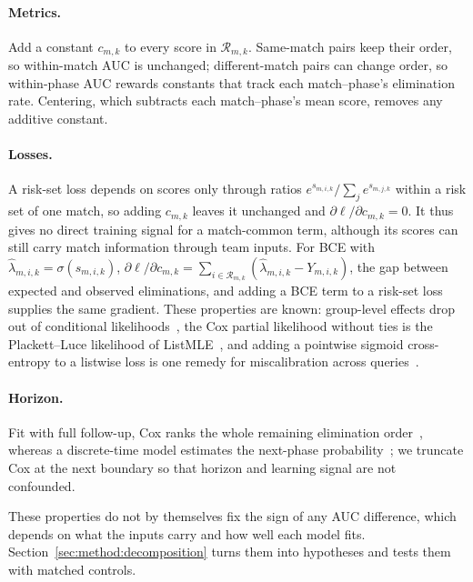 \documentclass[sigconf,anonymous]{acmart}
\begin{document}
\paragraph{Metrics.}
Add a constant $c_{m,k}$ to every score in $\mathcal{R}_{m,k}$. Same-match pairs keep their order, so within-match AUC is unchanged; different-match pairs can change order, so within-phase AUC rewards constants that track each match--phase's elimination rate. Centering, which subtracts each match--phase's mean score, removes any additive constant.

\paragraph{Losses.}
A risk-set loss depends on scores only through ratios $e^{s_{m,i,k}}/\sum_{j}e^{s_{m,j,k}}$ within a risk set of one match, so adding $c_{m,k}$ leaves it unchanged and $\partial\ell/\partial c_{m,k}=0$. It thus gives no direct training signal for a match-common term, although its scores can still carry match information through team inputs. For BCE with $\hat\lambda_{m,i,k}=\sigma(s_{m,i,k})$, $\partial\ell/\partial c_{m,k}=\sum_{i\in\mathcal{R}_{m,k}}(\hat\lambda_{m,i,k}-Y_{m,i,k})$, the gap between expected and observed eliminations, and adding a BCE term to a risk-set loss supplies the same gradient. These properties are known: group-level effects drop out of conditional likelihoods~\cite{Chamberlain80}, the Cox partial likelihood without ties is the Plackett--Luce likelihood of ListMLE~\cite{Xia08}, and adding a pointwise sigmoid cross-entropy to a listwise loss is one remedy for miscalibration across queries~\cite{Bai23}.

\paragraph{Horizon.}
Fit with full follow-up, Cox ranks the whole remaining elimination order~\cite{Cox72}, whereas a discrete-time model estimates the next-phase probability~\cite{SingerWillett93,Gensheimer19}; we truncate Cox at the next boundary so that horizon and learning signal are not confounded.


These properties do not by themselves fix the sign of any AUC difference, which depends on what the inputs carry and how well each model fits. Section~\ref{sec:method:decomposition} turns them into hypotheses and tests them with matched controls.

\end{document}
